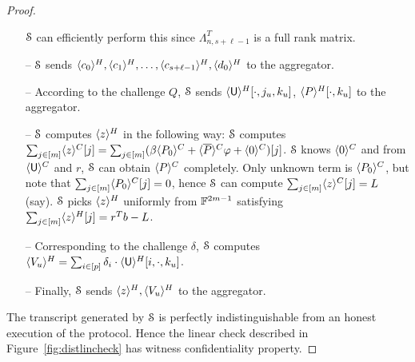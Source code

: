 \begin{proof}
\begin{itemize}
		$\mathcal{S}$ can efficiently perform this since $\Lambda_{n,s+\ell-1}^T$ is a full rank matrix.
		\item[--] $\mathcal{S}$ sends $\langle{c_0}\rangle^H, \langle{c_1}\rangle^H,\ldots, \langle{c_{s+\ell-1}}\rangle^H, \langle{d_0}\rangle^H$ to the aggregator.
		\item[--] According to the challenge $Q$, $\mathcal{S}$ sends $\langle{\mathsf{U}}\rangle^H[\cdot, j_u,k_u]$, $\langle{P}\rangle^H[\cdot,k_u]$ to the aggregator.
		\item[--] $\mathcal{S}$ computes $\langle{z}\rangle^H$ in the following way:
		$\mathcal{S}$ computes \\
		$\sum_{j\in[m]}\langle{z}\rangle^C[j] 
		=\sum_{j\in[m]} (\beta \langle{P_0}\rangle^C+\langle{\overline{P}}\rangle^C\varphi + \langle{0}\rangle^C)[j]$.
		$\mathcal{S}$ knows $\langle{0}\rangle^C$ and from $\langle{\mathsf{U}}\rangle^C$ and $r$, $\mathcal{S}$ can obtain $\langle{P}\rangle^C$ completely. Only unknown term is $\langle{P_0}\rangle^C$, but note that $\sum_{j\in[m]}\langle{P_0}\rangle^C[j] = 0$, hence $\mathcal{S}$ can compute $\sum_{j\in[m]}\langle{z}\rangle^C[j] = L$ (say).
		$\mathcal{S}$ picks $\langle{z}\rangle^H$ uniformly from $\mathbb{F}^{2m-1}$ satisfying $\sum_{j\in[m]} \langle{z}\rangle^H[j]= r^Tb-L$.
		\item[--] Corresponding to the challenge $\delta$, $\mathcal{S}$ computes $\langle{V_u}\rangle^H = \sum_{i\in[p]} \delta_i\cdot \langle{\mathsf{U}}\rangle^H[i,\cdot, k_u]$.
		\item[--] Finally, $\mathcal{S}$ sends $\langle{z}\rangle^H, \langle{V_u}\rangle^H$ to the aggregator.
	\end{itemize}
	The transcript generated by $\mathcal{S}$ is perfectly indistinguishable from an honest execution of the protocol. Hence the linear check described in Figure~\ref{fig:distlincheck} has witness confidentiality property.
\end{proof}

